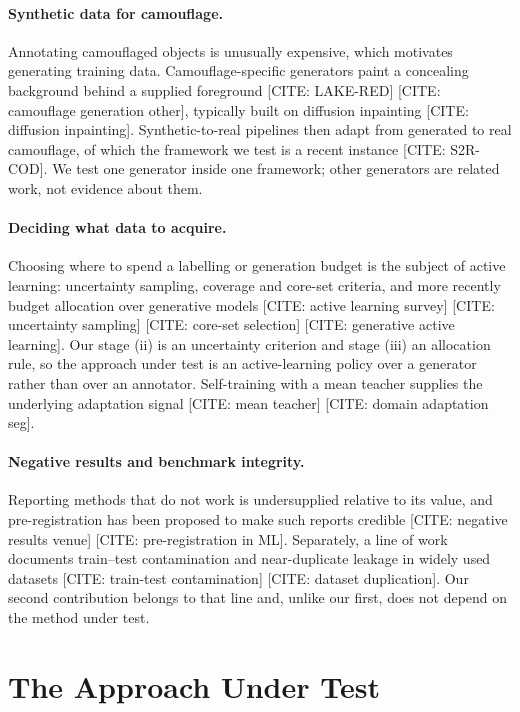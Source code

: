 \documentclass{article}
\begin{document}
\paragraph{Synthetic data for camouflage.}
Annotating camouflaged objects is unusually expensive, which motivates
generating training data. Camouflage-specific generators paint a concealing
background behind a supplied foreground [CITE: LAKE-RED]
[CITE: camouflage generation other], typically built on diffusion inpainting
[CITE: diffusion inpainting]. Synthetic-to-real pipelines then adapt from
generated to real camouflage, of which the framework we test is a recent
instance [CITE: S2R-COD]. We test one generator inside one framework; other
generators are related work, not evidence about them.

\paragraph{Deciding what data to acquire.}
Choosing where to spend a labelling or generation budget is the subject of active
learning: uncertainty sampling, coverage and core-set criteria, and more recently
budget allocation over generative models
[CITE: active learning survey] [CITE: uncertainty sampling]
[CITE: core-set selection] [CITE: generative active learning]. Our stage (ii)
is an uncertainty criterion and stage (iii) an allocation rule, so the approach
under test is an active-learning policy over a generator rather than over an
annotator. Self-training with a mean teacher supplies the underlying adaptation
signal [CITE: mean teacher] [CITE: domain adaptation seg].

\paragraph{Negative results and benchmark integrity.}
Reporting methods that do not work is undersupplied relative to its value, and
pre-registration has been proposed to make such reports credible
[CITE: negative results venue] [CITE: pre-registration in ML]. Separately, a
line of work documents train--test contamination and near-duplicate leakage in
widely used datasets [CITE: train-test contamination]
[CITE: dataset duplication]. Our second contribution belongs to that line and,
unlike our first, does not depend on the method under test.

\section{The Approach Under Test}
\label{sec:method}
\end{document}
